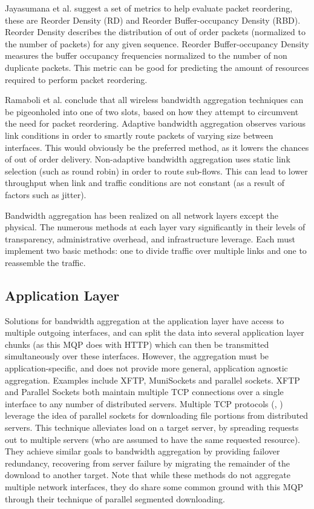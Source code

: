 \documentclass[12pt]{article}
\begin{document}
	Jayasumana et al. suggest a set of metrics to help evaluate packet reordering, these are Reorder Density (RD) and Reorder Buffer-occupancy Density (RBD). Reorder Density describes the distribution of out of order packets (normalized to the number of packets) for any given sequence. Reorder Buffer-occupancy Density measures the buffer occupancy frequencies normalized to the number of non duplicate packets. This metric can be good for predicting the amount of resources required to perform packet reordering\cite{rfc5236}.

	Ramaboli et al. conclude that all wireless bandwidth aggregation techniques can be pigeonholed into one of two slots, based on how they attempt to circumvent the need for packet reordering. Adaptive bandwidth aggregation observes various link conditions in order to smartly route packets of varying size between interfaces. This would obviously be the preferred method, as it lowers the chances of out of order delivery. Non-adaptive bandwidth aggregation uses static link selection (such as round robin) in order to route sub-flows. This can lead to lower throughput when link and traffic conditions are not constant (as a result of factors such as jitter)\cite{Ramaboli20121674}.

	Bandwidth aggregation has been realized on all network layers except the physical. The numerous methods at each layer vary significantly in their levels of transparency, administrative overhead, and infrastructure leverage. Each must implement two basic methods: one to divide traffic over multiple links and one to reassemble the traffic.

	\subsection{Application Layer}

		Solutions for bandwidth aggregation at the application layer have access to multiple outgoing interfaces, and can split the data into several application layer chunks (as this MQP does with HTTP) which can then be transmitted simultaneously over these interfaces. However, the aggregation must be application-specific, and does not provide more general, application agnostic aggregation. Examples include XFTP, MuniSockets and parallel sockets. XFTP and Parallel Sockets both maintain multiple TCP connections over a single interface to any number of distributed servers\cite{Ramaboli20121674}. Multiple TCP protocols (\cite{1541208}, \cite{4539690}) leverage the idea of parallel sockets for downloading file portions from distributed servers. This technique alleviates load on a target server, by spreading requests out to multiple servers (who are assumed to have the same requested resource). They achieve similar goals to bandwidth aggregation by providing failover redundancy, recovering from server failure by migrating the remainder of the download to another target. Note that while these methods do not aggregate multiple network interfaces, they do share some common ground with this MQP through their technique of parallel segmented downloading.
\end{document}
